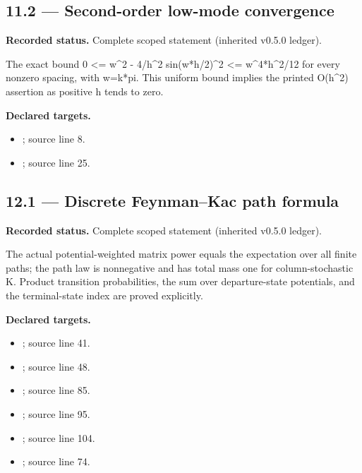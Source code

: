 \subsection{11.2 — Second-order low-mode convergence}
\label{result:11.2}
\textbf{Recorded status.} Complete scoped statement (inherited v0.5.0 ledger).\par
The exact bound 0 <= w\textasciicircum{}2 - 4/h\textasciicircum{}2 sin(w*h/2)\textasciicircum{}2 <= w\textasciicircum{}4*h\textasciicircum{}2/12 for every nonzero spacing, with w=k*pi. This uniform bound implies the printed O(h\textasciicircum{}2) assertion as positive h tends to zero.

\textbf{Declared targets.}\begin{itemize}
\item {}; source line 8.
\item {}; source line 25.
\end{itemize}
\subsection{12.1 — Discrete Feynman--Kac path formula}
\label{result:12.1}
\textbf{Recorded status.} Complete scoped statement (inherited v0.5.0 ledger).\par
The actual potential-weighted matrix power equals the expectation over all finite paths; the path law is nonnegative and has total mass one for column-stochastic K. Product transition probabilities, the sum over departure-state potentials, and the terminal-state index are proved explicitly.

\textbf{Declared targets.}\begin{itemize}
\item {}; source line 41.
\item {}; source line 48.
\item {}; source line 85.
\item {}; source line 95.
\item {}; source line 104.
\item {}; source line 74.
\end{itemize}

